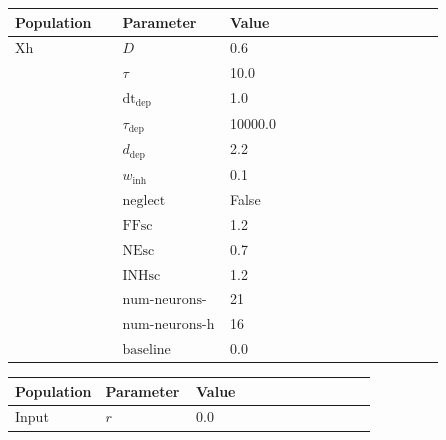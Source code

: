 \documentclass{article}
\begin{document}
\vspace{2ex}

\noindent
\begin{tabularx}{\linewidth}{|p{0.25\linewidth}|p{0.25\linewidth}|X|}\hline
\textbf{Population} & \textbf{Parameter} & \textbf{Value}   \\ \hline

    Xh             & $D$        & 0.6  \\ \hline

                 & $\tau$        & 10.0  \\ \hline

                 & ${\text{dt}}_{\text{dep}}$        & 1.0  \\ \hline

                 & $\tau_{\text{dep}}$        & 10000.0  \\ \hline

                 & $d_{\text{dep}}$        & 2.2  \\ \hline

                 & $w_{\text{inh}}$        & 0.1  \\ \hline

                 & ${\text{neglect}}$        & False  \\ \hline

                 & ${\text{FFsc}}$        & 1.2  \\ \hline

                 & ${\text{NEsc}}$        & 0.7  \\ \hline

                 & ${\text{INHsc}}$        & 1.2  \\ \hline

                 & ${\text{num-neurons-w}}$        & 21  \\ \hline

                 & ${\text{num-neurons-h}}$        & 16  \\ \hline

                 & ${\text{baseline}}$        & 0.0  \\ \hline

\end{tabularx}

\vspace{2ex}

\noindent
\begin{tabularx}{\linewidth}{|p{0.25\linewidth}|p{0.25\linewidth}|X|}\hline
\textbf{Population} & \textbf{Parameter} & \textbf{Value}   \\ \hline

    Input             & $r$        & 0.0  \\ \hline

\end{tabularx}
\end{document}
